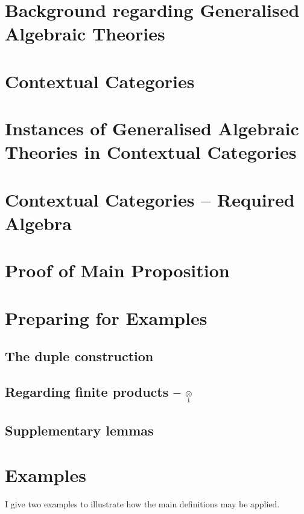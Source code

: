 \documentclass[10pt,a4paper]{article}
\theoremstyle{remark}
\begin{document}
\section{Background regarding Generalised Algebraic Theories}


\section{Contextual Categories }


\section{Instances of Generalised Algebraic Theories in Contextual Categories}
\label{sectioninwhichinstanceisdefined}


\section{Contextual Categories -- Required Algebra}
\label{contextualnotationparttwo}


\section{Proof of Main Proposition}
\label{proofofmainproposition}


\section{Preparing for Examples}
\label{supplementarymaterial}
\subsection{The duple construction}

\subsection{Regarding finite products -- $\underset{1}{\otimes}$}

\subsection{Supplementary lemmas}


\section{Examples}
\label{examples}
I give two examples to illustrate how the main definitions may be applied.
\end{document}
